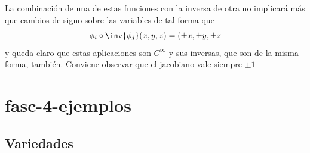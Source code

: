 \begin{problem}[6]
\begin{enumerate}
\end{enumerate}

La combinación de una de estas funciones con la inversa de otra no implicará más que cambios de signo sobre las variables de tal forma que
\[\phi_i\circ \inv{\phi_j}(x,y,z)=(\pm x, \pm y, \pm z\]
y queda claro que estas aplicaciones son $C^{\infty}$ y sus inversas, que son de la misma forma, también. Conviene observar que el jacobiano vale siempre $\pm 1$
\end{problem}

\section{fasc-4-ejemplos}

\subsection{Variedades}
